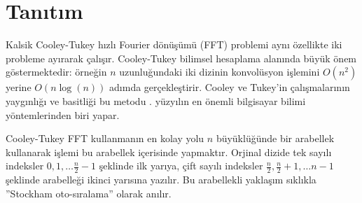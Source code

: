 \documentclass[10pt]{article}
\begin{document}
\section*{Tan{\i}t{\i}m}
Kalsik Cooley-Tukey h{\i}zl{\i} Fourier d\"{o}n\"{u}\c{s}\"{u}m\"{u} (FFT) problemi ayn{\i} \"{o}zellikte 
iki probleme ay{\i}rarak \c{c}al{\i}\c{s}{\i}r\cite{cooley:algorithm}. Cooley-Tukey bilimsel 
hesaplama alan{\i}nda b\"{u}y\"{u}k \"{o}nem g\"{o}stermektedir: \"{o}rne\u{g}in $n$ uzunlu\u{g}undaki iki 
dizinin konvol\"{u}syon i\c{s}lemini $O(n^2)$ yerine $O(n \log(n))$ ad{\i}mda 
ger\c{c}ekle\c{s}tirir\cite{proakis:introduction}. Cooley ve Tukey'in \c{c}al{\i}\c{s}malar{\i}n{\i}n 
yayg{\i}nl{\i}\u{g}{\i} ve basitli\u{g}i bu metodu 
. y\"{u}zy{\i}l{\i}n en \"{o}nemli bilgisayar bilimi y\"{o}ntemlerinden 
biri yapar\cite{cipra:best}.

Cooley-Tukey FFT kullanman{\i}n en kolay yolu $n$ b\"{u}y\"{u}kl\"{u}\u{g}\"{u}nde bir arabellek 
kullanarak i\c{s}lemi bu arabellek i\c{c}erisinde yapmakt{\i}r. Orjinal 
dizide tek say{\i}l{\i} indeksler $0, 1, \ldots
\frac{n}{2}-1$ \c{s}eklinde ilk yar{\i}ya, \c{c}ift say{\i}l{\i} indeksler
$\frac{n}{2}, \frac{n}{2}+1, \ldots n-1$ \c{s}eklinde arabelle\u{g}i ikinci 
yar{\i}s{\i}na yaz{\i}l{\i}r. Bu arabellekli yakla\c{s}{\i}m s{\i}kl{\i}kla ''Stockham
oto-s{\i}ralama'' olarak an{\i}l{\i}r\cite{cochran:fast}.
\end{document}
